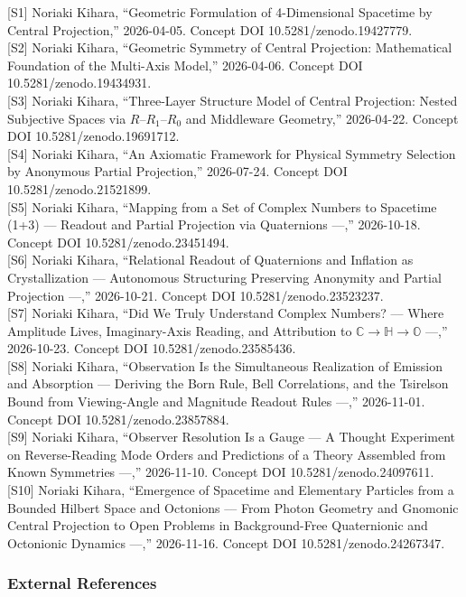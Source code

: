\documentclass[
  a4paper,
]{article}
\begin{document}
{[}S1{]} Noriaki Kihara, ``Geometric Formulation of 4-Dimensional
Spacetime by Central Projection,'' 2026-04-05. Concept DOI
10.5281/zenodo.19427779.\\
{[}S2{]} Noriaki Kihara, ``Geometric Symmetry of Central Projection:
Mathematical Foundation of the Multi-Axis Model,'' 2026-04-06. Concept
DOI 10.5281/zenodo.19434931.\\
{[}S3{]} Noriaki Kihara, ``Three-Layer Structure Model of Central
Projection: Nested Subjective Spaces via \(R\)--\(R_1\)--\(R_0\) and
Middleware Geometry,'' 2026-04-22. Concept DOI
10.5281/zenodo.19691712.\\
{[}S4{]} Noriaki Kihara, ``An Axiomatic Framework for Physical Symmetry
Selection by Anonymous Partial Projection,'' 2026-07-24. Concept DOI
10.5281/zenodo.21521899.\\
{[}S5{]} Noriaki Kihara, ``Mapping from a Set of Complex Numbers to
Spacetime (1+3) --- Readout and Partial Projection via Quaternions
---,'' 2026-10-18. Concept DOI 10.5281/zenodo.23451494.\\
{[}S6{]} Noriaki Kihara, ``Relational Readout of Quaternions and
Inflation as Crystallization --- Autonomous Structuring Preserving
Anonymity and Partial Projection ---,'' 2026-10-21. Concept DOI
10.5281/zenodo.23523237.\\
{[}S7{]} Noriaki Kihara, ``Did We Truly Understand Complex Numbers? ---
Where Amplitude Lives, Imaginary-Axis Reading, and Attribution to
\(\mathbb{C} \to \mathbb{H} \to \mathbb{O}\) ---,'' 2026-10-23. Concept
DOI 10.5281/zenodo.23585436.\\
{[}S8{]} Noriaki Kihara, ``Observation Is the Simultaneous Realization
of Emission and Absorption --- Deriving the Born Rule, Bell
Correlations, and the Tsirelson Bound from Viewing-Angle and Magnitude
Readout Rules ---,'' 2026-11-01. Concept DOI 10.5281/zenodo.23857884.\\
{[}S9{]} Noriaki Kihara, ``Observer Resolution Is a Gauge --- A Thought
Experiment on Reverse-Reading Mode Orders and Predictions of a Theory
Assembled from Known Symmetries ---,'' 2026-11-10. Concept DOI
10.5281/zenodo.24097611.\\
{[}S10{]} Noriaki Kihara, ``Emergence of Spacetime and Elementary
Particles from a Bounded Hilbert Space and Octonions --- From Photon
Geometry and Gnomonic Central Projection to Open Problems in
Background-Free Quaternionic and Octonionic Dynamics ---,'' 2026-11-16.
Concept DOI 10.5281/zenodo.24267347.

\subsubsection{External References}\label{external-references}
\end{document}
